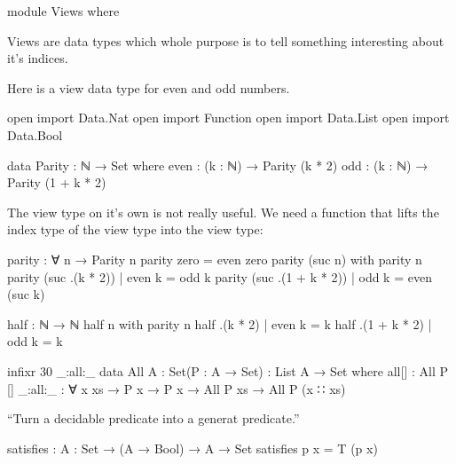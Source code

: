 \begin{code}
module Views where
\end{code}

Views are data types which whole purpose is to tell something
interesting about it's indices.

Here is a view data type for even and odd numbers.
\begin{code}
open import Data.Nat
open import Function
open import Data.List
open import Data.Bool

data Parity : ℕ → Set where
  even : (k : ℕ) → Parity (k * 2)
  odd  : (k : ℕ) → Parity (1 + k * 2)
\end{code}

The view type on it's own is not really useful.
We need a function that lifts the index type of the
view type into the view type:
\begin{code}
parity : ∀ n → Parity n
parity zero = even zero
parity (suc n) with parity n
parity (suc .(k * 2)) | even k = odd k
parity (suc .(1 + k * 2)) | odd k = even (suc k)
\end{code}

\begin{code}
half : ℕ → ℕ
half n with parity n
half .(k * 2)     | even k = k
half .(1 + k * 2) | odd k  = k
\end{code}

\begin{code}
infixr 30 _:all:_
data All {A : Set}(P : A → Set) : List A → Set where
  all[] : All P []
  _:all:_ : ∀ {x xs} → P x → P x → All P xs → All P (x ∷ xs)
\end{code}

“Turn a decidable predicate into a generat predicate.”
\begin{code}
satisfies : {A : Set} → (A → Bool) → A → Set
satisfies p x = T (p x)
\end{code}